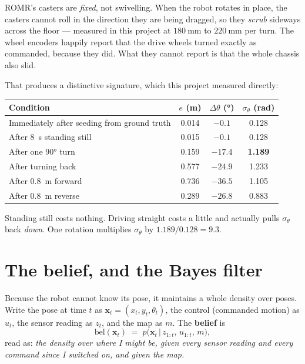 \documentclass[11pt,a4paper]{report}
\newcommand{\term}[1]{\textcolor{rust}{\textbf{#1}}}
\newcommand{\xt}{\mathbf{x}}
\begin{document}
ROMR's casters are \emph{fixed}, not swivelling. When the robot rotates in
place, the casters cannot roll in the direction they are being dragged, so
they \emph{scrub} sideways across the floor --- measured in this project at
$\SI{180}{\milli\metre}$ to $\SI{220}{\milli\metre}$ per turn. The wheel
encoders happily report that the drive wheels turned exactly as commanded,
because they did. What they cannot report is that the whole chassis also slid.

That produces a distinctive signature, which this project measured directly:

\begin{center}
\begin{tabular}{@{}lccc@{}}
\toprule
\textbf{Condition} & $e$ (\si{\metre}) & $\Delta\theta$ (\si{\degree}) & $\sigma_\theta$ (\si{\radian}) \\
\midrule
Immediately after seeding from ground truth & 0.014 & $-0.1$ & 0.128 \\
After \SI{8}{\second} standing still        & 0.015 & $-0.1$ & 0.128 \\
After one \ang{90} turn                     & 0.159 & $-17.4$& \textbf{1.189} \\
After turning back                          & 0.577 & $-24.9$& 1.233 \\
After \SI{0.8}{\metre} forward              & 0.736 & $-36.5$& 1.105 \\
After \SI{0.8}{\metre} reverse              & 0.289 & $-26.8$& 0.883 \\
\bottomrule
\end{tabular}
\end{center}

Standing still costs nothing. Driving straight costs a little and actually
pulls $\sigma_\theta$ back \emph{down}. One rotation multiplies $\sigma_\theta$
by $1.189/0.128 = 9.3$.

\section{The belief, and the Bayes filter}

Because the robot cannot know its pose, it maintains a whole density over
poses. Write the pose at time $t$ as
$\xt_t = (x_t, y_t, \theta_t)$, the control (commanded motion) as $u_t$, the
sensor reading as $z_t$, and the map as $m$. The \term{belief} is
\begin{equation}
\mathrm{bel}(\xt_t) \;=\; p\bigl(\xt_t \,\big|\, z_{1:t},\, u_{1:t},\, m\bigr),
\label{eq:belief}
\end{equation}
read as: \emph{the density over where I might be, given every sensor reading
and every command since I switched on, and given the map.}
\end{document}
